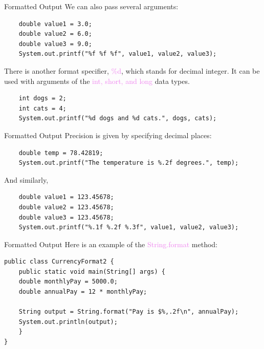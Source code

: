 \documentclass[11pt]{beamer}
\newcommand{\violet}[1]{\textcolor{violet}{#1}}
\begin{document}
\begin{frame}[fragile]{Formatted Output}
    We can also pass several arguments:
    \begin{lstlisting}
    double value1 = 3.0;
    double value2 = 6.0;
    double value3 = 9.0;
    System.out.printf("%f %f %f", value1, value2, value3);
    \end{lstlisting}

    There is another format specifier, \violet{\%d}, which stands for decimal integer. It can be used with arguments of the \violet{int, short, and long} data types.

    \begin{lstlisting}
    int dogs = 2;
    int cats = 4;
    System.out.printf("%d dogs and %d cats.", dogs, cats);
    \end{lstlisting}    
\end{frame}

\begin{frame}[fragile]{Formatted Output}
    Precision is given by specifying decimal places:
    \begin{lstlisting}
    double temp = 78.42819;
    System.out.printf("The temperature is %.2f degrees.", temp);
    \end{lstlisting}
    And similarly,
    \begin{lstlisting}
    double value1 = 123.45678;
    double value2 = 123.45678;
    double value3 = 123.45678;
    System.out.printf("%.1f %.2f %.3f", value1, value2, value3);            
    \end{lstlisting}
\end{frame}

\begin{frame}[fragile]{Formatted Output}
    Here is an example of the \violet{String.format} method:
    \begin{lstlisting}
public class CurrencyFormat2 {
    public static void main(String[] args) {
    double monthlyPay = 5000.0;
    double annualPay = 12 * monthlyPay;

    String output = String.format("Pay is $%,.2f\n", annualPay);
    System.out.println(output);
    }
}
    \end{lstlisting}
\end{frame}
\end{document}
